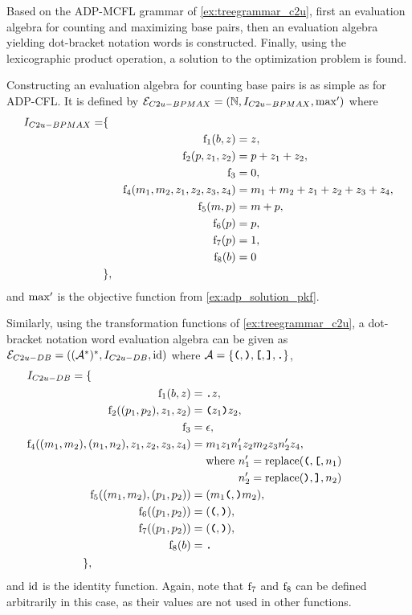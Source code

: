 \documentclass[
    a4paper,
    12pt,
    twoside,
    BCOR=12mm,
    parskip=half,
    chapterprefix,
    numbers=noenddot,
    bibliography=totoc
]{scrbook}
\begin{document}
\begin{example}
	\label{ex:adp_solution_c2u}
	Based on the ADP-MCFL grammar of \cref{ex:treegrammar_c2u}, first an evaluation algebra for counting and maximizing base pairs, then an evaluation algebra yielding dot-bracket notation words is constructed. Finally, using the lexicographic product operation, a solution to the optimization problem is found.
	
	Constructing an evaluation algebra for counting base pairs is as simple as for ADP-CFL. It is defined by $\mathcal{E}_{C2u-BPMAX}=(\mathbb{N},I_{C2u-BPMAX},\mathrm{max}')$ where
	\begin{align*}
		I_{C2u-BPMAX} = &\{&&\\
		&&\mathrm{f}_1 (b,z) &= z,\\
		&&\mathrm{f}_2 (p,z_1,z_2) &= p + z_1 + z_2,\\
		&&\mathrm{f}_3  &= 0,\\
		&&\mathrm{f}_4 (m_1,m_2,z_1,z_2,z_3,z_4) &= m_1 + m_2 + z_1 + z_2 + z_3 + z_4,\\
		&&\mathrm{f}_5 (m,p) &= m + p,\\
		&&\mathrm{f}_6 (p) &= p,\\
		&&\mathrm{f}_7 (p) &= 1,\\
		&&\mathrm{f}_8 (b) &= 0\\
		&\},&&
	\end{align*}	
	and $\mathrm{max}'$ is the objective function from \cref{ex:adp_solution_pkf}.
	
	Similarly, using the transformation functions of \cref{ex:treegrammar_c2u}, a dot-bracket notation word evaluation algebra can be given as $\mathcal{E}_{C2u-DB}=((\mathcal{A}^*)^*,I_{C2u-DB},\mathrm{id})$ where $\mathcal{A} = \{ \ts{(},\ts{)},\ts{[},\ts{]},\ts{.} \}$,
	\begin{align*}
		&I_{C2u-DB} = \{&\hspace{9cm}\\
		&\mathrlap{\begin{aligned}
			\op{f}_1(b,z) &= \ts{.}z,\\
			\op{f}_2((p_1,p_2),z_1,z_2) &= \ts{(} z_1 \ts{)} z_2,\\
			\op{f}_3 &= \epsilon,\\
			\op{f}_4((m_1,m_2),(n_1,n_2),z_1,z_2,z_3,z_4) &= m_1 z_1 n'_1 z_2 m_2 z_3 n'_2 z_4,\\
			&\mathrel{\phantom{=}}\text{where } n'_1 = \op{replace}(\ts{(},\ts{[},n_1)\\
			&\mathrel{\phantom{=}}\phantom{\text{where }} n'_2 = \op{replace}(\ts{)},\ts{]},n_2)\\
			\op{f}_5((m_1,m_2),(p_1,p_2)) &= (m_1 \ts{(},\ts{)} m_2),\\
			\op{f}_6 ((p_1,p_2)) &= (\ts{(},\ts{)}),\\
			\op{f}_7 ((p_1,p_2)) &= (\ts{(},\ts{)}),\\
			\op{f}_8 (b) &= \ts{.}
		\end{aligned}}\\
		&\phantom{I_{C2u-DB}\mathrel{=}} \},
	\end{align*}
	and $\mathrm{id}$ is the identity function. Again, note that $\mathrm{f}_7$ and $\mathrm{f}_8$ can be defined arbitrarily in this case, as their values are not used in other functions.


\end{example}
\end{document}
